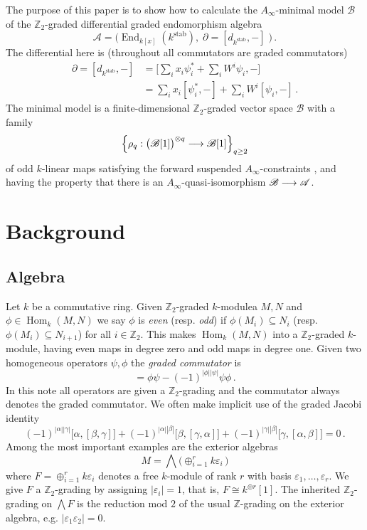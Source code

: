 \documentclass[english,letter paper,12pt,leqno]{article}
\theoremstyle{example}
\numberwithin{equation}{section}
\def\stab{\operatorname{stab}}
\def\Hom{\operatorname{Hom}}
\def\be{\begin{equation}}
\def\ee{\end{equation}}
\def\nZ{\mathds{Z}}
\DeclareMathOperator{\End}{End}
\begin{document}
The purpose of this paper is to show how to calculate the $A_\infty$-minimal model $\mathscr{B}$ of the $\nZ_2$-graded differential graded endomorphism algebra
\be\label{eq:defnaw}
\mathscr{A} = \Big( \End_{k[x]}(k^{\operatorname{stab}}), \; \partial = [d_{k^{\stab}},-] \; \Big)\,.
\ee 
The differential here is (throughout all commutators are graded commutators)
\begin{align*}
\partial = [d_{k^{\stab}},-] &= \Big[\sum_i x_i \psi_i^* + \sum_i W^i \psi_i, -\Big]\\
&= \sum_i x_i [\psi_i^*,-] + \sum_i W^i [\psi_i,-]\,.
\end{align*}
The minimal model is a finite-dimensional $\nZ_2$-graded vector space $\mathscr{B}$ with a family 
\[
\left\{ \rho_q: \big(\mathscr{B}[1]\big)^{\otimes q} \longrightarrow \mathscr{B}[1] \right\}_{q \ge 2}
\]
of odd $k$-linear maps satisfying the forward suspended $A_\infty$-constraints \cite{lazaroiu}, and having the property that there is an $A_\infty$-quasi-isomorphism $\mathscr{B} \longrightarrow \mathscr{A}$.

\section{Background}

\subsection{Algebra}

Let $k$ be a commutative ring. Given $\nZ_2$-graded $k$-modulea $M, N$ and $\phi \in \Hom_k(M,N)$ we say $\phi$ is \emph{even} (resp. \emph{odd}) if $\phi(M_i) \subseteq N_i$ (resp. $\phi(M_i) \subseteq N_{i+1}$) for all $i \in \nZ_2$. This makes $\Hom_k(M,N)$ into a $\nZ_2$-graded $k$-module, having even maps in degree zero and odd maps in degree one. Given two homogeneous operators $\psi, \phi$ the \emph{graded commutator} is
\be
[\phi, \psi] = \phi \psi - (-1)^{|\phi||\psi|} \psi \phi\,.
\ee
In this note all operators are given a $\nZ_2$-grading and the commutator always denotes the graded commutator. We often make implicit use of the graded Jacobi identity
\be\label{eq:graded_jacobi}
(-1)^{|\alpha||\gamma|}\big[ \alpha, [\beta, \gamma]\big] + (-1)^{|\alpha||\beta|}\big[ \beta, [\gamma, \alpha] \big] + (-1)^{|\gamma||\beta|} \big[ \gamma, [\alpha, \beta] \big] = 0\,.
\ee
Among the most important examples are the exterior algebras
\[
M = \bigwedge\big( \oplus_{i=1}^r k \varepsilon_i \,\big)
\]
where $F = \oplus_{i=1}^r k \varepsilon_i$ denotes a free $k$-module of rank $r$ with basis $\varepsilon_1,\ldots,\varepsilon_r$. We give $F$ a $\nZ_2$-grading by assigning $|\varepsilon_i| = 1$, that is, $F \cong k^{\oplus r}[1]$. The inherited $\nZ_2$-grading on $\bigwedge F$ is the reduction mod $2$ of the usual $\nZ$-grading on the exterior algebra, e.g. $|\varepsilon_1 \varepsilon_2| = 0$.
\end{document}
